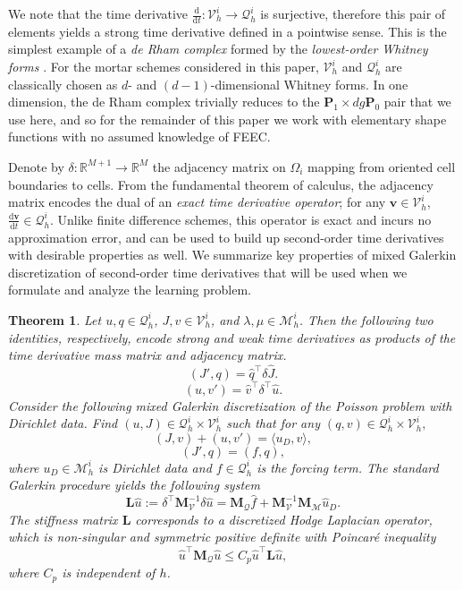 \documentclass[12pt]{article}
\newtheorem{theorem}{Theorem}
\begin{document}
We note that the time derivative $\frac{\mathrm{d}}{\mathrm{d}t}:\mathcal{V}_h^i\rightarrow\mathcal{Q}_h^i$ is surjective,  therefore this pair of elements yields a strong time derivative defined in a pointwise sense. This is the simplest example of a \textit{de Rham complex} formed by the \textit{lowest-order Whitney forms} \cite{arnold2018finite,actor2024data}. For the mortar schemes considered in this paper, $\mathcal{V}_h^i$ and $\mathcal{Q}_h^i$ are classically chosen as $d$- and $(d-1)$-dimensional Whitney forms. In one dimension, the de Rham complex trivially reduces to the $\mathbf{P}_1 \times dg\mathbf{P}_0$ pair that we use here, and so for the remainder of this paper we work with elementary shape functions with no assumed knowledge of FEEC.

Denote by $\delta:\mathbb{R}^{M+1}\rightarrow\mathbb{R}^{M}$ the adjacency matrix on $\Omega_i$ mapping from oriented cell boundaries to cells. From the fundamental theorem of calculus, the adjacency matrix encodes the dual of an \textit{exact time derivative operator}; for any $\mathbf{v} \in \mathcal{V}_h^i$, $\frac{\mathrm{d}\mathbf{v}}{\mathrm{d}t} \in \mathcal{Q}_h^i$. Unlike finite difference schemes, this operator is exact and incurs no approximation error, and can be used to build up second-order time derivatives with desirable properties as well. We summarize key properties of mixed Galerkin discretization of second-order time derivatives that will be used when we formulate and analyze the learning problem.

\begin{theorem}\label{thm:hodgetheory}
    Let $u,q \in \mathcal{Q}_h^i$, $J,v \in \mathcal{V}_h^i$, and $\lambda,\mu \in \mathcal{M}_h^i$. Then the following two identities, respectively, encode \textit{strong} and \textit{weak} time derivatives as products of the time derivative mass matrix and adjacency matrix.
    $$({J}',q) = \hat{q}^\intercal  \delta \hat{J}.$$
    $$(u,{v}') = \hat{v}^\intercal \delta^\intercal \hat{u}.$$
    Consider the following mixed Galerkin discretization of the Poisson problem with Dirichlet data. Find $(u,J) \in \mathcal{Q}_h^i\times \mathcal{V}_h^i$ such that for any $(q,v) \in \mathcal{Q}_h^i\times \mathcal{V}_h^i,$
    $$ (J,v) + (u,v') = \langle u_D,v \rangle, $$
    $$ (J',q) = (f,q),$$
    where $u_D \in \mathcal{M}_h^i$ is Dirichlet data and $f \in \mathcal{Q}_h^i$ is the forcing term. The standard Galerkin procedure yields the following system
    $$\mathbf{L} \hat{u} :=   \delta^\intercal \mathbf{M}_{\mathcal{V}}^{-1}\delta\hat{u} = \mathbf{M}_{\mathcal{Q}}\hat{f} + \mathbf{M}_\mathcal{V}^{-1}\mathbf{M}_\mathcal{M} \hat{u}_D.
 $$
    The stiffness matrix $\mathbf{L}$ corresponds to a discretized Hodge Laplacian operator, which is non-singular and symmetric positive definite with Poincar\'e inequality 
    $$\hat{u}^\intercal \mathbf{M}_{\mathcal{Q}} \hat{u} \leq C_p \hat{u}^\intercal \mathbf{L} \hat{u}, 
    $$ 
    where $C_p$ is independent of $h$.
\end{theorem}
\end{document}
